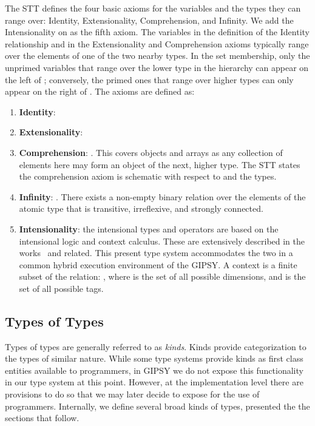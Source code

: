 \documentclass{easychair}
\newcommand{\gipsy}{{GIPSY\index{GIPSY}}}
\begin{document}
The STT defines the four basic axioms for the variables and the
types they can range over: Identity, Extensionality, Comprehension,
and Infinity. We add the Intensionality on as the fifth axiom. The variables in the definition
of the Identity relationship and in the Extensionality and Comprehension
axioms typically range over the elements of one of the two
nearby types. In the set membership, only the unprimed variables
that range over the lower type in the hierarchy can appear on the
left of ; conversely, the primed ones that range over higher
types can only appear on the right of . The axioms are defined as:


\begin{enumerate}
\item
{\bf Identity}: 
\item
{\bf Extensionality}: 
\item
{\bf Comprehension}: . This covers objects and arrays as any collection of elements here may form
an object of the next, higher type. The STT states the comprehension axiom is schematic with respect to  and the types.
\item
{\bf Infinity}: . There exists a non-empty binary relation  over the elements of the atomic type that is transitive, irreflexive, and strongly connected. 
\item
{\bf Intensionality}: the intensional types and operators are based on the intensional logic and context calculus. These are extensively described in the works~\cite{gipsy-simple-context-calculus-08,gipsy-context-calculus-07,wanphd06,paquetThesis} and related. This present type system accommodates the two in a common
hybrid execution environment of the {\gipsy}.
A context  is a finite subset of the relation: , where  is the set of all possible dimensions, and  is the set of all possible tags.
\end{enumerate}


\subsection{Types of Types}

Types of types are generally referred to as {\em kinds}.
Kinds provide categorization to the types of similar nature.
While some type systems provide kinds as first class entities
available to programmers, in {\gipsy} we do not expose this
functionality in our type system at this point. However,
at the implementation level there are provisions to do so
that we may later decide to expose for the use of programmers.
Internally, we define several broad kinds of types, presented
the the sections that follow.
\end{document}
